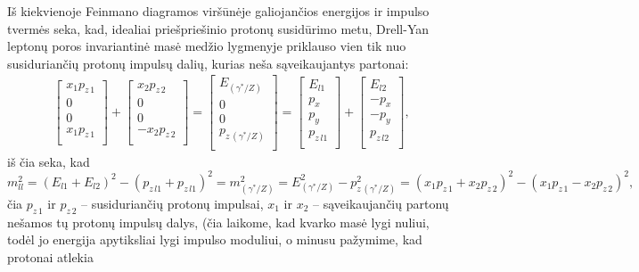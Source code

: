 \documentclass[a4paper, 12pt, oneside]{article}
\newlength\q
\begin{document}
Iš kiekvienoje Feinmano diagramos viršūnėje galiojančios energijos ir impulso tvermės seka, kad, idealiai priešpriešinio
protonų susidūrimo metu, Drell-Yan leptonų poros invariantinė masė medžio lygmenyje priklauso vien
tik nuo susiduriančių protonų impulsų dalių, kurias neša sąveikaujantys partonai:
\begin{align}
\label{eq:DY4vec}
	\begin{bmatrix}
		x_1p_{z\,1} \\		
		0 \\
		0 \\
		x_1p_{z\,1} \\
	\end{bmatrix}
	+
	\begin{bmatrix}
		x_2p_{z\,2} \\
		0 \\
		0 \\
		-x_2p_{z\,2} \\
	\end{bmatrix}
	=
	\begin{bmatrix}
		E_{(\gamma^*\!/\!Z)} \\
		0 \\
		0 \\
		p_{z\,(\gamma^*\!/\!Z)} \\
	\end{bmatrix}
	=
	\begin{bmatrix}
		E_{l1} \\
		p_{x} \\
		p_{y} \\
		p_{z\,l1} \\
	\end{bmatrix}
	+
	\begin{bmatrix}
		E_{l2} \\
		-p_{x} \\
		-p_{y} \\
		p_{z\,l2} \\
	\end{bmatrix}	
	,
\end{align}
iš čia seka, kad
\begin{equation}
\label{eq:DYinvm}
	m^2_{ll} = (E_{l1}+E_{l2})^2-(p_{z\,l1}+p_{z\,l1})^2 = m^2_{(\gamma^*\!/\!Z)} = E^2_{(\gamma^*\!/\!Z)}-p^2_{z\,(\gamma^*\!/\!Z)} =
	(x_1p_{z\,1}+x_2p_{z\,2})^2-(x_1p_{z\,1}-x_2p_{z\,2})^2 ,
\end{equation}
čia $p_{z\,1}$ ir $p_{z\,2}$ -- susiduriančių protonų impulsai, $x_1$ ir $x_2$ -- sąveikaujančių partonų nešamos tų protonų impulsų dalys,
(čia laikome, kad kvarko masė lygi nuliui, todėl jo energija apytiksliai lygi impulso moduliui, o minusu pažymime, kad protonai atlekia
\end{document}
